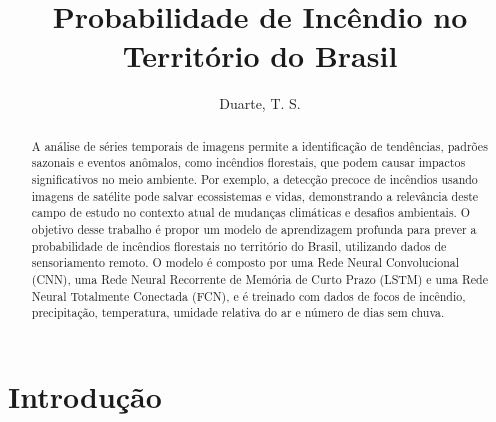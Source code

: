 \documentclass[journal]{IEEEtran}
\begin{document}
\title{Probabilidade de Incêndio no Território do Brasil}
\author{Duarte, T. S.}

\maketitle

\begin{abstract}
    A análise de séries temporais de imagens permite a identificação de tendências, padrões sazonais e eventos anômalos, como incêndios florestais, que podem causar impactos significativos no meio ambiente. Por exemplo, a detecção precoce de incêndios usando imagens de satélite pode salvar ecossistemas e vidas, demonstrando a relevância deste campo de estudo no contexto atual de mudanças climáticas e desafios ambientais.\newline
    O objetivo desse trabalho é propor um modelo de aprendizagem profunda para prever a probabilidade de incêndios florestais no território do Brasil, utilizando dados de sensoriamento remoto. O modelo é composto por uma Rede Neural Convolucional (CNN), uma Rede Neural Recorrente de Memória de Curto Prazo (LSTM) e uma Rede Neural Totalmente Conectada (FCN), e é treinado com dados de focos de incêndio, precipitação, temperatura, umidade relativa do ar e número de dias sem chuva.
\end{abstract}

\section{Introdução}
\end{document}
